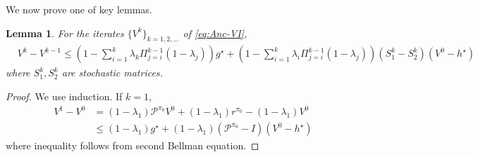 \documentclass{article} %
\newcommand{\cP}{\mathcal{P}}
\newcommand*{\para}[1]{\left({#1}\right)}
\newtheorem{lemma}{Lemma}
\begin{document}
We now prove one of key lemmas. 
\begin{lemma}\label{lem::anc_upper_bd}
For the iterates $\{V^k\}_{k=1,2,\dots}$ of \ref{eq:Anc-VI},
\begin{align*}
    &V^k-V^{k-1} \le \para{1-\sum_{i=1}^{k} \lambda_k \Pi^{k-1}_{j=i} (1-\lambda_j)}g^{\star} + \para{1-\sum_{i=1}^{k} \lambda_i \Pi^{k-1}_{j=i} (1-\lambda_j)}(S^{k}_1 -S^{k}_2)(V^0-h^{\star})
\end{align*}   
where $S^{k}_1,S^{k}_2$ are stochastic matrices.
\end{lemma}
\begin{proof}
We use induction. If $k=1$, 
\begin{align*}
    V^1-V^0 &= (1-\lambda_1) \cP^{\pi_0}V^0 +(1-\lambda_1)r^{\pi_0} -(1-\lambda_1)V^0  
    \\& \le (1-\lambda_1)g^{\star}+(1-\lambda_1) (\cP^{\pi_0}-I)(V^0-h^{\star})
\end{align*}
where inequality follows from second Bellman equation. 


\end{proof}
\end{document}

